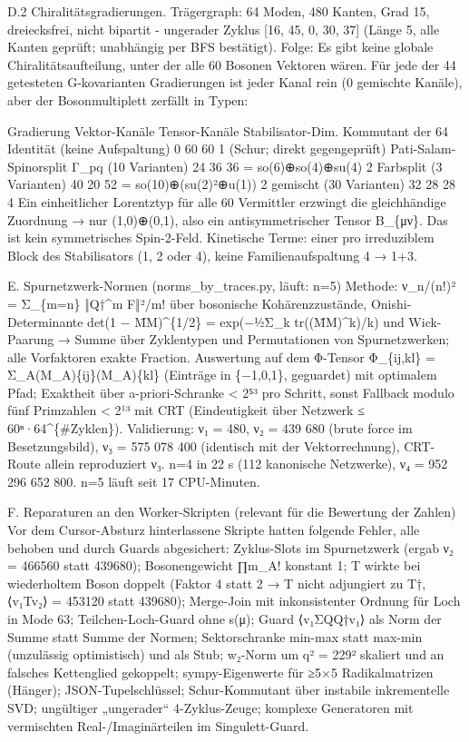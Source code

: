 D.2 Chiralitätsgradierungen. Trägergraph: 64 Moden, 480 Kanten, Grad 15,
dreiecksfrei, nicht bipartit - ungerader Zyklus {[}16, 45, 0, 30, 37{]}
(Länge 5, alle Kanten geprüft; unabhängig per BFS bestätigt). Folge: Es
gibt keine globale Chiralitätsaufteilung, unter der alle 60 Bosonen
Vektoren wären. Für jede der 44 getesteten G-kovarianten Gradierungen
ist jeder Kanal rein (0 gemischte Kanäle), aber der Bosonmultiplett
zerfällt in Typen:

Gradierung Vektor-Kanäle Tensor-Kanäle Stabilisator-Dim. Kommutant der
64 Identität (keine Aufspaltung) 0 60 60 1 (Schur; direkt gegengeprüft)
Pati-Salam-Spinorsplit Γ\_pq (10 Varianten) 24 36 36 = so(6)⊕\allowbreak{}so(4)⊕\allowbreak{}su(4)
2 Farbsplit (3 Varianten) 40 20 52 = so(10)⊕\allowbreak{}(su(2)²⊕\allowbreak{}u(1)) 2 gemischt (30
Varianten) 32 28 28 4 Ein einheitlicher Lorentztyp für alle 60
Vermittler erzwingt die gleichhändige Zuordnung → nur (1,0)⊕\allowbreak{}(0,1), also
ein antisymmetrischer Tensor B\_\{μν\}. Das ist kein symmetrisches
Spin-2-Feld. Kinetische Terme: einer pro irreduziblem Block des
Stabilisators (1, 2 oder 4), keine Familienaufspaltung 4 → 1+3.

E. Spurnetzwerk-Normen (norms\_by\_traces.py, läuft: n=5) Methode:
ν\_n/(n!)² = Σ\_\{\textbar m\textbar=n\} ‖Q†\^{}m F‖²/m! über bosonische
Kohärenzzustände, Onishi-Determinante det(1 − M̄M)\^{}\{1/2\} =
exp(−½Σ\_k tr((M̄M)\^{}k)/k) und Wick-Paarung → Summe über Zyklentypen
und Permutationen von Spurnetzwerken; alle Vorfaktoren exakte Fraction.
Auswertung auf dem Φ-Tensor Φ\_\{ij,kl\} = Σ\_A(M\_A)\{ij\}(M\_A)\{kl\}
(Einträge in \{−1,0,1\}, geguardet) mit optimalem Pfad; Exaktheit über
a-priori-Schranke \textless{} 2⁵³ pro Schritt, sonst Fallback modulo
fünf Primzahlen \textless{} 2¹³ mit CRT (Eindeutigkeit über
\textbar Netzwerk\textbar{} ≤ 60ⁿ·64\^{}\{\#Zyklen\}). Validierung: ν₁ =
480, ν₂ = 439 680 (brute force im Besetzungsbild), ν₃ = 575 078 400
(identisch mit der Vektorrechnung), CRT-Route allein reproduziert ν₃.
n=4 in 22 s (112 kanonische Netzwerke), ν₄ = 952 296 652 800. n=5 läuft
seit 17 CPU-Minuten.

F. Reparaturen an den Worker-Skripten (relevant für die Bewertung der
Zahlen) Vor dem Cursor-Absturz hinterlassene Skripte hatten folgende
Fehler, alle behoben und durch Guards abgesichert: Zyklus-Slots im
Spurnetzwerk (ergab ν₂ = 466560 statt 439680); Bosonengewicht ∏m\_A!
konstant 1; T wirkte bei wiederholtem Boson doppelt (Faktor 4 statt 2 →
T nicht adjungiert zu T†, ⟨v₁\textbar Tv₂⟩ = 453120 statt 439680);
Merge-Join mit inkonsistenter Ordnung für Loch in Mode 63;
Teilchen-Loch-Guard ohne s(μ); Guard ⟨v₁\textbar ΣQQ†\textbar v₁⟩ als
Norm der Summe statt Summe der Normen; Sektorschranke min-max statt
max-min (unzulässig optimistisch) und als Stub; w₂-Norm um q² = 229²
skaliert und an falsches Kettenglied gekoppelt; sympy-Eigenwerte für
≥5×5 Radikalmatrizen (Hänger); JSON-Tupelschlüssel; Schur-Kommutant über
instabile inkrementelle SVD; ungültiger „ungerader`` 4-Zyklus-Zeuge;
komplexe Generatoren mit vermischten Real-/Imaginärteilen im
Singulett-Guard.

